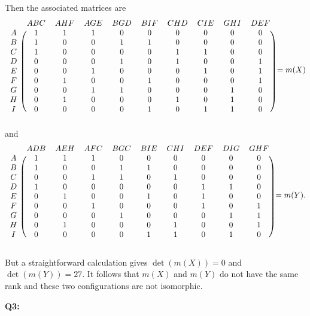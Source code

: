 \documentclass[12pt,reqno]{amsart}
\theoremstyle{definition}
\begin{document}
Then the associated matrices are
\[
  \begin{blockarray}{cccccccccc}
    & ABC & AHF & AGE & BGD & BIF & CHD & CIE & GHI & DEF \\
    \begin{block}{c(ccccccccc)}
      A & 1 & 1 & 1 & 0 & 0 & 0&0&0&0 \\
      B & 1 & 0 & 0 & 1 & 1&0&0&0&0 \\
      C & 1&0&0&0&0&1&1&0&0\\
      D &0&0&0&1&0&1&0&0&1\\
      E &0&0&1&0&0&0&1&0&1\\
      F &0&1&0&0&1&0&0&0&1\\
      G &0&0&1&1&0&0&0&1&0\\
      H &0&1&0&0&0&1&0&1&0\\
      I &0&0&0&0&1&0&1&1&0\\
    \end{block}
  \end{blockarray} = m(X)
\]
and
\[
  \begin{blockarray}{cccccccccc}
    & ADB & AEH &AFC& BGC&BIE&CHI&DEF&DIG&GHF\\
    \begin{block}{c(ccccccccc)}
      A & 1 & 1 & 1 & 0 & 0 & 0&0&0&0 \\
      B & 1 & 0 & 0 & 1 & 1&0&0&0&0 \\
      C &0&0&1&1&0&1&0&0&0\\
      D &1&0&0&0&0&0&1&1&0\\
      E &0&1&0&0&1&0&1&0&0\\
      F &0&0&1&0&0&0&1&0&1\\
      G &0&0&0&1&0&0&0&1&1\\
      H &0&1&0&0&0&1&0&0&1\\
      I &0&0&0&0&1&1&0&1&0\\
    \end{block}
  \end{blockarray} = m(Y).
\]

But a straightforward calculation gives $\det(m(X)) = 0$ and $\det(m(Y))=27$. It follows that $m(X)$ and $m(Y)$ do not have the same rank and these two configurations are not isomorphic.


\newpage
\noindent \textbf{Q3:}

\begin{center}
\end{center}
\end{document}
